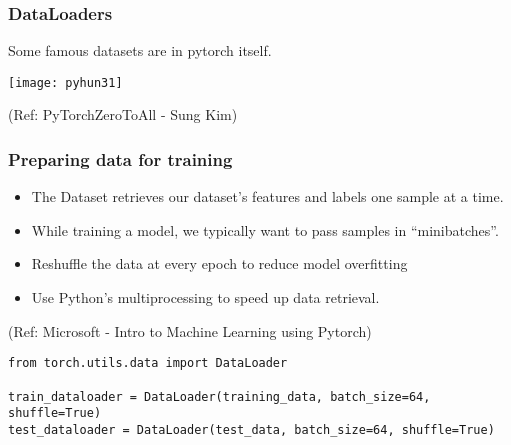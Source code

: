 \begin{frame}[fragile] \frametitle{DataLoaders}
Some famous datasets are in pytorch itself.
\begin{center}
\texttt{[image: pyhun31]}
\end{center}

\tiny{(Ref: PyTorchZeroToAll  - Sung Kim)}
\end{frame}


\begin{frame}[fragile] \frametitle{Preparing data for training}

\begin{itemize}
\item The Dataset retrieves our dataset's features and labels one sample at a time.
\item While training a model, we typically want to pass samples in ``minibatches''.
\item Reshuffle the data at every epoch to reduce model overfitting
\item Use Python's multiprocessing to speed up data retrieval.
\end{itemize}

\tiny{(Ref: Microsoft - Intro to Machine Learning using Pytorch)}

\begin{lstlisting}
from torch.utils.data import DataLoader

train_dataloader = DataLoader(training_data, batch_size=64, shuffle=True)
test_dataloader = DataLoader(test_data, batch_size=64, shuffle=True)
\end{lstlisting}

\end{frame}

